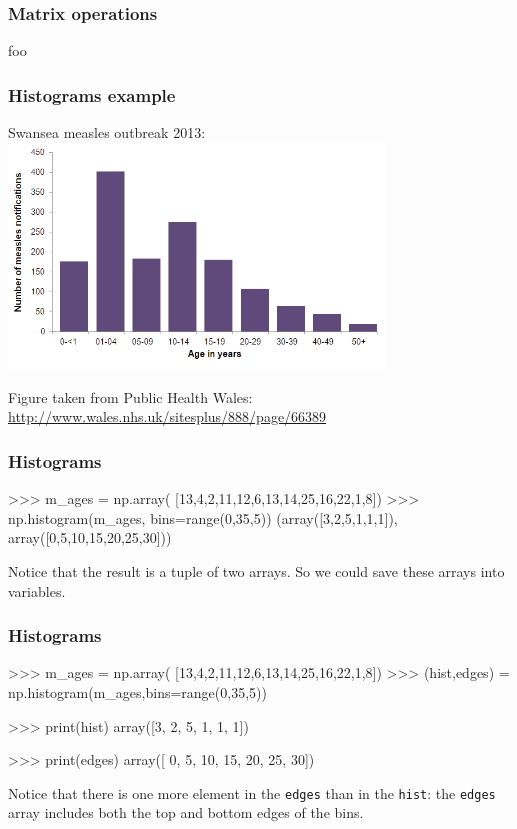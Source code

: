 \documentclass{beamer}
\begin{document}
\begin{frame}[fragile]
\frametitle{Matrix operations}

foo
\end{frame}


\begin{frame}[fragile]
\frametitle{Histograms example}
Swansea measles outbreak 2013:
\includegraphics[width=10cm]{measlesbyage01072013.jpg}

Figure taken from Public Health Wales: \url{http://www.wales.nhs.uk/sitesplus/888/page/66389}
\end{frame}


\begin{frame}[fragile]
\frametitle{Histograms}
\begin{code}
>>> m_ages = np.array(
      [13,4,2,11,12,6,13,14,25,16,22,1,8])
>>> np.histogram(m_ages, bins=range(0,35,5))
(array([3,2,5,1,1,1]), array([0,5,10,15,20,25,30]))
\end{code}

Notice that the result is a tuple of two arrays. So we could save these arrays into variables.
\end{frame}

\begin{frame}[fragile]
\frametitle{Histograms}
\begin{code}
>>> m_ages = np.array(
      [13,4,2,11,12,6,13,14,25,16,22,1,8])
>>> (hist,edges) = np.histogram(m_ages,bins=range(0,35,5))

>>> print(hist)
array([3, 2, 5, 1, 1, 1])

>>> print(edges)
array([ 0,  5, 10, 15, 20, 25, 30])
\end{code}

Notice that there is one more element in the \texttt{edges} than in the \texttt{hist}: the \texttt{edges} array includes both the top and bottom edges of the bins.
\end{frame}
\end{document}
